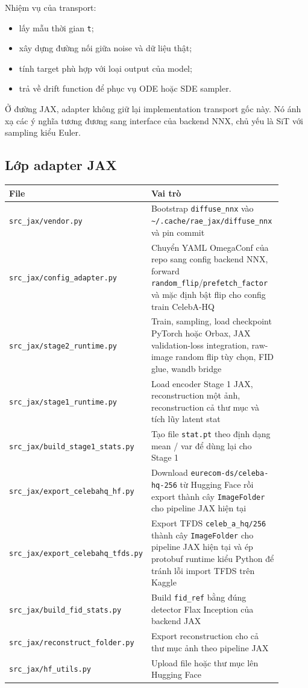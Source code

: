 Nhiệm vụ của transport:

\begin{itemize}[leftmargin=1.5em]
  \item lấy mẫu thời gian \texttt{t};
  \item xây dựng đường nối giữa noise và dữ liệu thật;
  \item tính target phù hợp với loại output của model;
  \item trả về drift function để phục vụ ODE hoặc SDE sampler.
\end{itemize}

Ở đường JAX, adapter không giữ lại implementation transport gốc này. Nó ánh xạ
các ý nghĩa tương đương sang interface của backend NNX, chủ yếu là SiT với
sampling kiểu Euler.

\subsection{Lớp adapter JAX}

\begin{center}
\begin{longtable}{>{\raggedright\arraybackslash}p{0.28\linewidth} >{\raggedright\arraybackslash}p{0.62\linewidth}}
\toprule
File & Vai trò \\
\midrule
\endhead
\texttt{src\_jax/vendor.py} & Bootstrap \texttt{diffuse\_nnx} vào \texttt{\~{}/.cache/rae\_jax/diffuse\_nnx} và pin commit \\
\texttt{src\_jax/config\_adapter.py} & Chuyển YAML OmegaConf của repo sang config backend NNX, forward \texttt{random\_flip}/\texttt{prefetch\_factor} và mặc định bật flip cho config train CelebA-HQ \\
\texttt{src\_jax/stage2\_runtime.py} & Train, sampling, load checkpoint PyTorch hoặc Orbax, JAX validation-loss integration, raw-image random flip tùy chọn, FID glue, wandb bridge \\
 \texttt{src\_jax/stage1\_runtime.py} & Load encoder Stage 1 JAX, reconstruction một ảnh, reconstruction cả thư mục và tích lũy latent stat \\
 \texttt{src\_jax/build\_stage1\_stats.py} & Tạo file \texttt{stat.pt} theo định dạng mean / var để dùng lại cho Stage 1 \\
 \texttt{src\_jax/export\_celebahq\_hf.py} & Download \texttt{eurecom-ds/celeba-hq-256} từ Hugging Face rồi export thành cây \texttt{ImageFolder} cho pipeline JAX hiện tại \\
 \texttt{src\_jax/export\_celebahq\_tfds.py} & Export TFDS \texttt{celeb\_a\_hq/256} thành cây \texttt{ImageFolder} cho pipeline JAX hiện tại và ép protobuf runtime kiểu Python để tránh lỗi import TFDS trên Kaggle \\
 \texttt{src\_jax/build\_fid\_stats.py} & Build \texttt{fid\_ref} bằng đúng detector Flax Inception của backend JAX \\
 \texttt{src\_jax/reconstruct\_folder.py} & Export reconstruction cho cả thư mục ảnh theo pipeline JAX \\
\texttt{src\_jax/hf\_utils.py} & Upload file hoặc thư mục lên Hugging Face \\
\bottomrule
\end{longtable}
\end{center}

